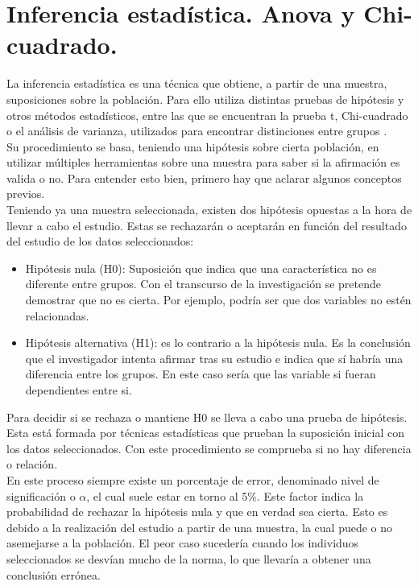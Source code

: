 \chapter{Inferencia estadística. Anova y Chi-cuadrado.}

La inferencia estadística es una técnica que obtiene, a partir de una muestra, suposiciones sobre la población. Para ello utiliza distintas pruebas de hipótesis y otros métodos estadísticos, entre las que se encuentran la prueba t, Chi-cuadrado o el análisis de varianza, utilizados para encontrar distinciones entre grupos \cite{INFERENC93:online}.  \\

Su procedimiento se basa, teniendo una hipótesis sobre cierta población, en utilizar múltiples herramientas sobre una muestra para saber si la afirmación es valida o no. Para entender esto bien, primero hay que aclarar algunos conceptos previos.\\

Teniendo ya una muestra seleccionada, existen dos hipótesis opuestas a la hora de llevar a cabo el estudio. Estas se rechazarán o aceptarán en función del resultado del estudio de los datos seleccionados: 

\begin{itemize}
	\item Hipótesis nula (H0): Suposición que indica que una característica no es diferente entre grupos. Con el transcurso de la investigación se pretende demostrar que no es cierta. Por ejemplo, podría ser que dos variables no estén relacionadas.
	\item Hipótesis alternativa (H1): es lo contrario a la hipótesis nula. Es la conclusión que el investigador intenta afirmar tras su estudio e indica que sí habría una diferencia entre los grupos. En este caso sería que las variable si fueran dependientes entre si.
\end{itemize}

Para decidir si se rechaza o mantiene H0 se lleva a cabo una prueba de hipótesis. Esta está formada por técnicas estadísticas que prueban la suposición inicial con los datos seleccionados. Con este procedimiento se comprueba si no hay diferencia o relación. \\

En este proceso siempre existe un porcentaje de error, denominado nivel de significación o $\alpha$, el cual suele estar en torno al 5\%. Este factor indica la probabilidad de rechazar la hipótesis nula y que en verdad sea cierta. Esto es debido a la realización del estudio a partir de una muestra, la cual puede o no asemejarse a la población. El peor caso sucedería cuando los individuos seleccionados se desvían mucho de la norma, lo que llevaría a obtener una conclusión errónea.\\

